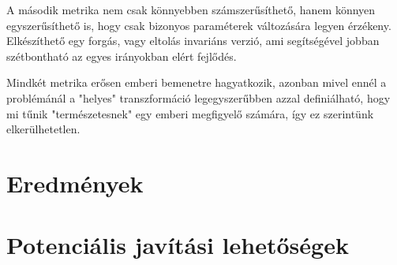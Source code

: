 A második metrika nem csak könnyebben számszerűsíthető, hanem könnyen egyszerűsíthető is, hogy csak bizonyos paraméterek változására legyen érzékeny.
Elkészíthető egy forgás, vagy eltolás invariáns verzió, ami segítségével jobban szétbontható az egyes irányokban elért fejlődés.

Mindkét metrika erősen emberi bemenetre hagyatkozik, azonban mivel ennél a problémánál a "helyes" transzformáció legegyszerűbben azzal definiálható, hogy mi tűnik "természetesnek" egy emberi megfigyelő számára, így ez szerintünk elkerülhetetlen.

\section{Eredmények}

\section{Potenciális javítási lehetőségek}

